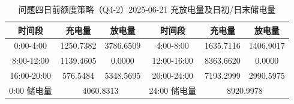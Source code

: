 \begin{table}[htbp]
\centering
\caption{问题四日前额度策略（Q4-2）2025-06-21 充放电量及日初/日末储电量}\label{tab:q4-storage}
\normalsize\setlength{\tabcolsep}{5pt}
\begin{tabular}{@{}cccccc@{}}
\toprule
时间段 & 充电量 & 放电量 & 时间段 & 充电量 & 放电量 \\
\midrule
0:00-4:00 & 1250.7382 & 3786.6509 & 4:00-8:00 & 1635.7116 & 1406.9017 \\
8:00-12:00 & 1139.4605 & 0.0000 & 12:00-16:00 & 8363.6620 & 0.0000 \\
16:00-20:00 & 576.5484 & 5348.5695 & 20:00-24:00 & 7193.2999 & 2990.5975 \\
0:00 储电量 & \multicolumn{2}{c}{4060.8313} & 24:00 储电量 & \multicolumn{2}{c}{8920.9978} \\
\bottomrule
\end{tabular}
\end{table}
